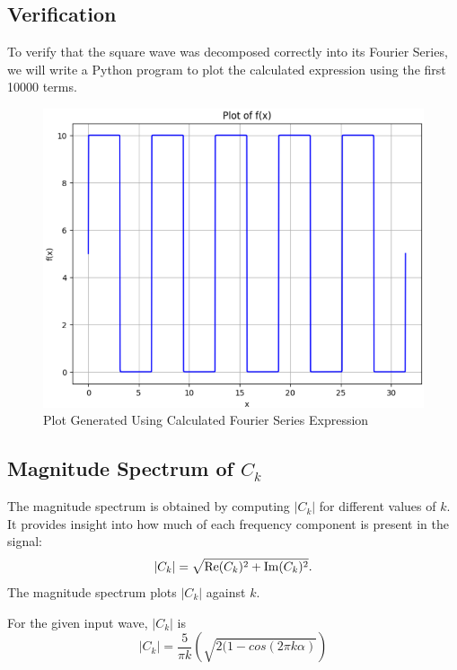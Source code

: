 \begin{multicols}{2}
\subsection{Verification}
To verify that the square wave was decomposed correctly into its Fourier Series, we will write a Python program to plot the calculated expression using the first 10000 terms. \\
\begin{figure}[H]
  \centering
  \includegraphics[width=\columnwidth]{sections/1_plot.png}
  \caption{Plot Generated Using Calculated Fourier Series Expression}
\end{figure}

\subsection{Magnitude Spectrum of $C_k$}
The magnitude spectrum is obtained by computing $|C_k|$ for different values of $k$. It provides insight into how much of each frequency component is present in the signal:
\begin{equation}
    |C_k| = \sqrt{\operatorname{Re}(C_k)^2 + \operatorname{Im}(C_k)^2}.\\
\end{equation}
The magnitude spectrum plots $|C_k|$ against $k$.

For the given input wave, $|C_k|$ is 
\begin{equation}
    |C_k| =\frac{5}{\pi k}\left(\sqrt{2(1-cos(2\pi k\alpha)} \right)
\end{equation}


\end{multicols}
